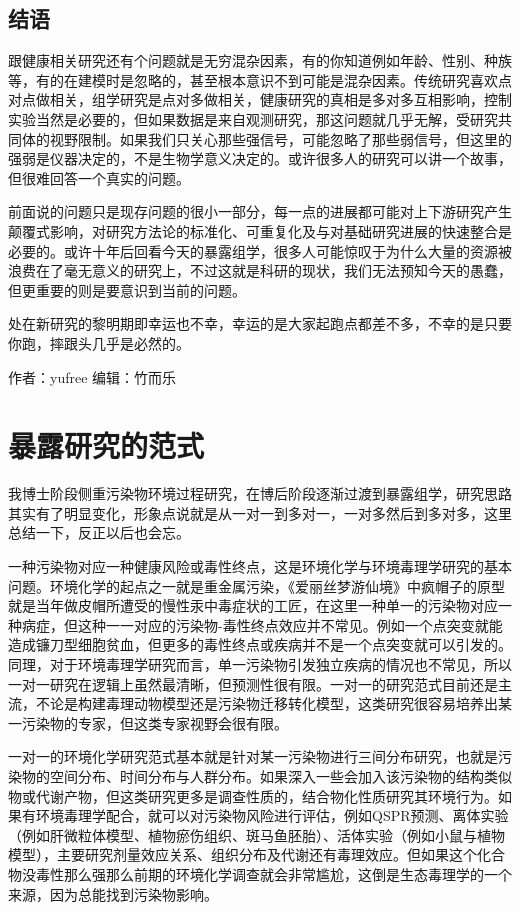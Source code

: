 \documentclass[
]{book}
\begin{document}
\hypertarget{ux7ed3ux8bed-4}{%
\subsection{结语}\label{ux7ed3ux8bed-4}}

跟健康相关研究还有个问题就是无穷混杂因素，有的你知道例如年龄、性别、种族等，有的在建模时是忽略的，甚至根本意识不到可能是混杂因素。传统研究喜欢点对点做相关，组学研究是点对多做相关，健康研究的真相是多对多互相影响，控制实验当然是必要的，但如果数据是来自观测研究，那这问题就几乎无解，受研究共同体的视野限制。如果我们只关心那些强信号，可能忽略了那些弱信号，但这里的强弱是仪器决定的，不是生物学意义决定的。或许很多人的研究可以讲一个故事，但很难回答一个真实的问题。

前面说的问题只是现存问题的很小一部分，每一点的进展都可能对上下游研究产生颠覆式影响，对研究方法论的标准化、可重复化及与对基础研究进展的快速整合是必要的。或许十年后回看今天的暴露组学，很多人可能惊叹于为什么大量的资源被浪费在了毫无意义的研究上，不过这就是科研的现状，我们无法预知今天的愚蠢，但更重要的则是要意识到当前的问题。

处在新研究的黎明期即幸运也不幸，幸运的是大家起跑点都差不多，不幸的是只要你跑，摔跟头几乎是必然的。

作者：yufree
编辑：竹而乐

\hypertarget{ux66b4ux9732ux7814ux7a76ux7684ux8303ux5f0f}{%
\section{暴露研究的范式}\label{ux66b4ux9732ux7814ux7a76ux7684ux8303ux5f0f}}

我博士阶段侧重污染物环境过程研究，在博后阶段逐渐过渡到暴露组学，研究思路其实有了明显变化，形象点说就是从一对一到多对一，一对多然后到多对多，这里总结一下，反正以后也会忘。

一种污染物对应一种健康风险或毒性终点，这是环境化学与环境毒理学研究的基本问题。环境化学的起点之一就是重金属污染，《爱丽丝梦游仙境》中疯帽子的原型就是当年做皮帽所遭受的慢性汞中毒症状的工匠，在这里一种单一的污染物对应一种病症，但这种一一对应的污染物-毒性终点效应并不常见。例如一个点突变就能造成镰刀型细胞贫血，但更多的毒性终点或疾病并不是一个点突变就可以引发的。同理，对于环境毒理学研究而言，单一污染物引发独立疾病的情况也不常见，所以一对一研究在逻辑上虽然最清晰，但预测性很有限。一对一的研究范式目前还是主流，不论是构建毒理动物模型还是污染物迁移转化模型，这类研究很容易培养出某一污染物的专家，但这类专家视野会很有限。

一对一的环境化学研究范式基本就是针对某一污染物进行三间分布研究，也就是污染物的空间分布、时间分布与人群分布。如果深入一些会加入该污染物的结构类似物或代谢产物，但这类研究更多是调查性质的，结合物化性质研究其环境行为。如果有环境毒理学配合，就可以对污染物风险进行评估，例如QSPR预测、离体实验（例如肝微粒体模型、植物瘀伤组织、斑马鱼胚胎）、活体实验（例如小鼠与植物模型），主要研究剂量效应关系、组织分布及代谢还有毒理效应。但如果这个化合物没毒性那么强那么前期的环境化学调查就会非常尴尬，这倒是生态毒理学的一个来源，因为总能找到污染物影响。
\end{document}
